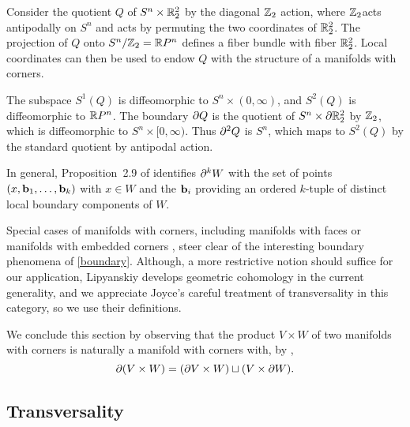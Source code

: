 \begin{example}\label{boundary}
	Consider the quotient $Q$ of $S^n \times \mathbb{R}^2_2$ by the diagonal $\mathbb{Z}_2$ action, where $\mathbb{Z}_2$acts antipodally on $S^n$ and acts by permuting the two coordinates
	of $\mathbb{R}^2_2$.
	The projection of $Q$ onto $S^n / \mathbb{Z}_2 = \mathbb{R} P^n$ defines a fiber bundle with fiber $\mathbb{R}^2_2$.
	Local coordinates can then be used to endow $Q$ with the structure of a manifolds with corners.

	The subspace $S^1(Q)$ is diffeomorphic to $S^n \times (0,\infty)$, and $S^2(Q)$ is diffeomorphic to $\mathbb{R} P^n$.
	The boundary $\partial Q$ is the quotient of $S^n \times \partial \mathbb{R}^2_2$ by $\mathbb{Z}_2$, which is diffeomorphic to
	$S^n \times [0,\infty)$.
	Thus $\partial^2 Q$ is $S^n$, which maps to $S^2(Q)$ by the standard quotient by antipodal action.
\end{example}

In general, Proposition~2.9 of \cite{Joy12} identifies $\partial^k W$ with the set of points $(x,\mathbf{b}_1,\ldots,\mathbf{b}_k)$ with $x \in W$ and the $\mathbf{b}_i$ providing an ordered $k$-tuple of distinct local boundary components of $W$.

\begin{comment}
\end{comment}

Special cases of manifolds with corners, including
manifolds with faces or manifolds with embedded corners \cite{Joy12}, steer clear of the interesting boundary phenomena of \cref{boundary}.
Although, a more restrictive notion should suffice for our application, Lipyanskiy develops geometric cohomology in the current generality, and we appreciate Joyce's careful treatment of transversality in this category, so we use their definitions.

We conclude this section by observing that the product $V \times W$ of two manifolds with corners is naturally a manifold with corners with, by \cite[Proposition 2.12]{Joy12},
$$\partial (V \times W) = (\partial V \times W) \sqcup (V \times \partial W).$$

\subsection{Transversality}

